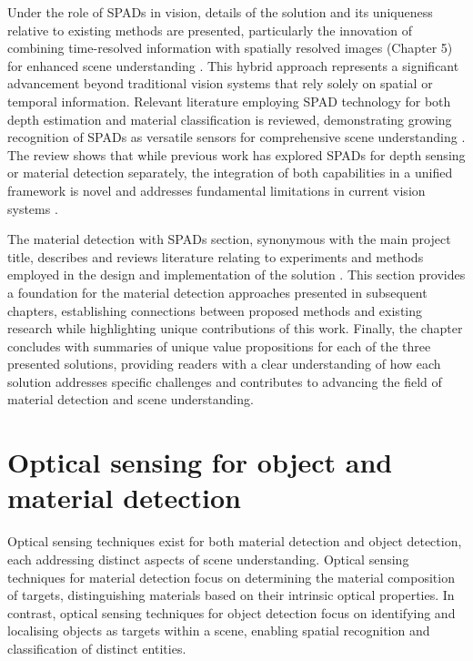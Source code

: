 \documentclass[12pt,a4paper,oneside]{report}
\let\oldsection\section
\renewcommand{\section}{\clearpage\oldsection}
\begin{document}
Under the role of SPADs in vision, details of the solution and its uniqueness relative to existing methods are presented, particularly the innovation of combining time-resolved information with spatially resolved images (Chapter 5) for enhanced scene understanding \cite{yang2023,yang2024,gadzicki2020}. This hybrid approach represents a significant advancement beyond traditional vision systems that rely solely on spatial or temporal information. Relevant literature employing SPAD technology for both depth estimation and material classification is reviewed, demonstrating growing recognition of SPADs as versatile sensors for comprehensive scene understanding \cite{su2016,becker2023,tafone2023,yang2024}. The review shows that while previous work has explored SPADs for depth sensing or material detection separately, the integration of both capabilities in a unified framework is novel and addresses fundamental limitations in current vision systems \cite{yang2023,yang2024,perez2024}.

The material detection with SPADs section, synonymous with the main project title, describes and reviews literature relating to experiments and methods employed in the design and implementation of the solution \cite{su2016,becker2023,tafone2023,yang2024}. This section provides a foundation for the material detection approaches presented in subsequent chapters, establishing connections between proposed methods and existing research while highlighting unique contributions of this work. Finally, the chapter concludes with summaries of unique value propositions for each of the three presented solutions, providing readers with a clear understanding of how each solution addresses specific challenges and contributes to advancing the field of material detection and scene understanding. 

\newpage
\section{Optical sensing for object and material detection}
\label{sec:optical_sensing_approaches}

Optical sensing techniques exist for both material detection and object detection, each addressing distinct aspects of scene understanding. Optical sensing techniques for material detection focus on determining the material composition of targets, distinguishing materials based on their intrinsic optical properties. In contrast, optical sensing techniques for object detection focus on identifying and localising objects as targets within a scene, enabling spatial recognition and classification of distinct entities.
\end{document}

